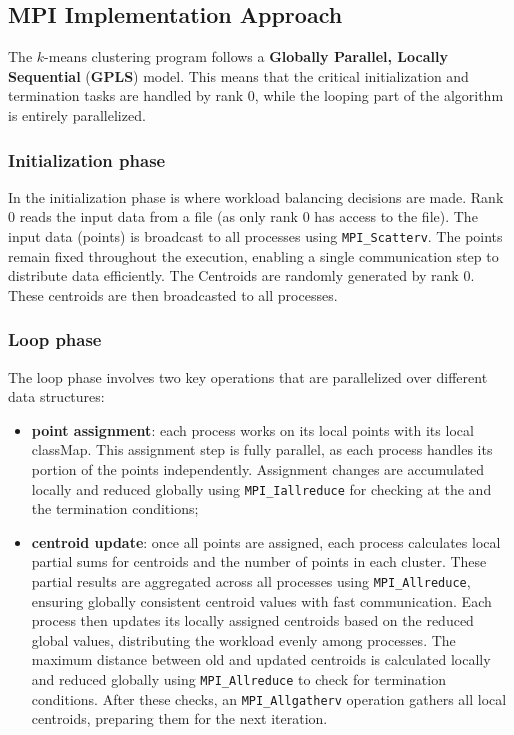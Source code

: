\documentclass[11pt, journal]{IEEEtran}
\newcommand{\nwl}{

\vspace{11pt}

}
\begin{document}
\subsection{MPI Implementation Approach}
The $k$-means clustering program follows a \textbf{Globally Parallel, Locally Sequential} (\textbf{GPLS}) model. This means that the critical initialization and termination tasks are handled by rank 0, while the looping part of the algorithm is entirely parallelized.
\nwl
\subsubsection{Initialization phase}
In the initialization phase is where workload balancing decisions are made.
Rank 0 reads the input data from a file (as only rank 0 has access to the file).
The input data (points) is broadcast to all processes using \verb|MPI_Scatterv|. The points remain fixed throughout the execution, enabling a single communication step to distribute data efficiently. The Centroids are randomly generated by rank 0. These centroids are then broadcasted to all processes.
\nwl
\subsubsection{Loop phase}
The loop phase involves two key operations that are parallelized over different data structures:
\begin{itemize}
    \item \textbf{point assignment}: each process works on its local points with its local classMap. This assignment step is fully parallel, as each process handles its portion of the points independently. Assignment changes are accumulated locally and reduced globally using \verb|MPI_Iallreduce| for checking at the and the termination conditions;
    \item \textbf{centroid update}: once all points are assigned, each process calculates local partial sums for centroids and the number of points in each cluster. These partial results are aggregated across all processes using \verb|MPI_Allreduce|, ensuring globally consistent centroid values with fast communication. Each process then updates its locally assigned centroids based on the reduced global values, distributing the workload evenly among processes. The maximum distance between old and updated centroids is calculated locally and reduced globally using \verb|MPI_Allreduce| to check for termination conditions. After these checks, an \verb|MPI_Allgatherv| operation gathers all local centroids, preparing them for the next iteration.
\end{itemize}
\end{document}
